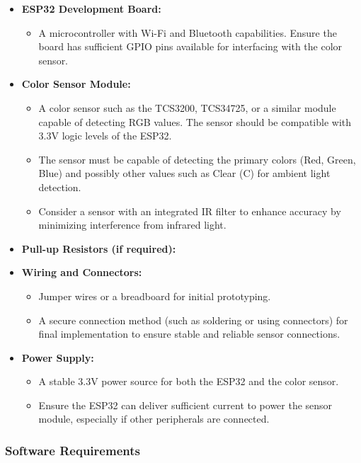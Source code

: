 \begin{itemize}
	\item \textbf{ESP32 Development Board:} 
	\begin{itemize}
		\item A microcontroller with Wi-Fi and Bluetooth capabilities. Ensure the board has sufficient GPIO pins available for interfacing with the color sensor.
	\end{itemize}
	
	\item \textbf{Color Sensor Module:}
	\begin{itemize}
		\item A color sensor such as the TCS3200, TCS34725, or a similar module capable of detecting RGB values. The sensor should be compatible with 3.3V logic levels of the ESP32.
		\item The sensor must be capable of detecting the primary colors (Red, Green, Blue) and possibly other values such as Clear (C) for ambient light detection.
		\item Consider a sensor with an integrated IR filter to enhance accuracy by minimizing interference from infrared light.
	\end{itemize}
	
	\item \textbf{Pull-up Resistors (if required):}

	
	\item \textbf{Wiring and Connectors:}
	\begin{itemize}
		\item Jumper wires or a breadboard for initial prototyping.
		\item A secure connection method (such as soldering or using connectors) for final implementation to ensure stable and reliable sensor connections.
	\end{itemize}
	
	\item \textbf{Power Supply:}
	\begin{itemize}
		\item A stable 3.3V power source for both the ESP32 and the color sensor.
		\item Ensure the ESP32 can deliver sufficient current to power the sensor module, especially if other peripherals are connected.
	\end{itemize}
\end{itemize}

\subsubsection*{Software Requirements}

